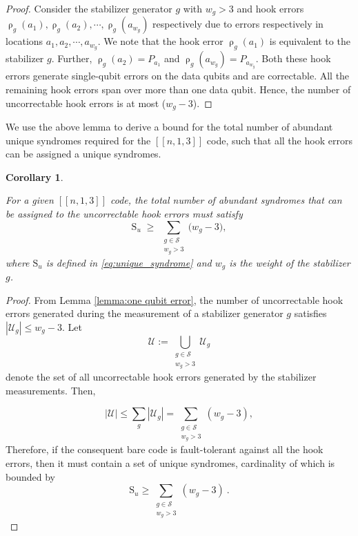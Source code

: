\documentclass[reprint, amsmath,amssymb, aps,pra,
 floatfix,
]{revtex4-2}
\newtheorem{corollary}[theorem]{Corollary}
\begin{document}
\begin{proof}

\noindent Consider the stabilizer generator $g$ with $w_g > 3$ and hook errors
$\operatorname{\rho}_{g}(a_{1}),\operatorname{\rho}_{g}(a_{2}),\cdots,\operatorname{\rho}_{g}(a_{w_g})$ respectively due to errors respectively in locations $a_1,a_2,\cdots, a_{w_g}$. 
We note that the hook error $\operatorname{\rho}_{g}(a_{1})$ is equivalent to the stabilizer $g$.
Further, $\operatorname{\rho}_{g}(a_{2})=P_{a_1}$ and $\operatorname{\rho}_{g}(a_{w_g})=P_{a_{w_g}}$.
Both these hook errors generate single-qubit errors on the data qubits and are correctable. 
All the remaining hook errors span over more than one data qubit.
Hence, the number of uncorrectable hook errors is at most ($w_g -3$).  

\end{proof}
\noindent We use the above lemma to derive a bound for the total number of abundant unique syndromes required for the $[[n,1,3]]$ code, such that all the hook errors can be assigned a unique syndromes.
\begin{corollary}
\label{corollary: 1}

For a given $[[n,1,3]]$ code, the total number of abundant syndromes that can be assigned to the uncorrectable hook errors must satisfy
\[
\mathrm{S}_u \;\ge\; \sum_{\substack{g \in \mathcal{S}\\ w_g > 3}} \big(w_g - 3\big),
\]
where $\mathrm{S}_{u}$ is defined in \eqref{eq:unique_syndrome} and $w_g$ is the weight of the stabilizer $g$.
\end{corollary}
\begin{proof}















From Lemma \ref{lemma:one qubit error}, the number of uncorrectable hook errors generated during the measurement of a stabilizer generator \(g\) satisfies
$|\mathcal{U}_g|\leq w_g-3 $.
Let $$\mathcal{U}
:=
\bigcup_{\substack{g\in\mathcal{S}\\ w_g>3}}
\mathcal{U}_g$$
denote the set of all uncorrectable hook errors generated by the
stabilizer measurements. Then,





\[
|\mathcal U| \le \sum_g|\mathcal U_g| = \sum_{\substack{g\in\mathcal S\\w_g>3}}(w_g-3),
\]
Therefore, if the consequent bare code is fault-tolerant against all the hook errors, then it must contain a set of unique syndromes, cardinality of which is bounded by
\[
\mathrm{S}_u \ge\sum_{\substack{g\in\mathcal S\\w_g>3}}(w_g-3)\ .
\]
\end{proof}
\end{document}
